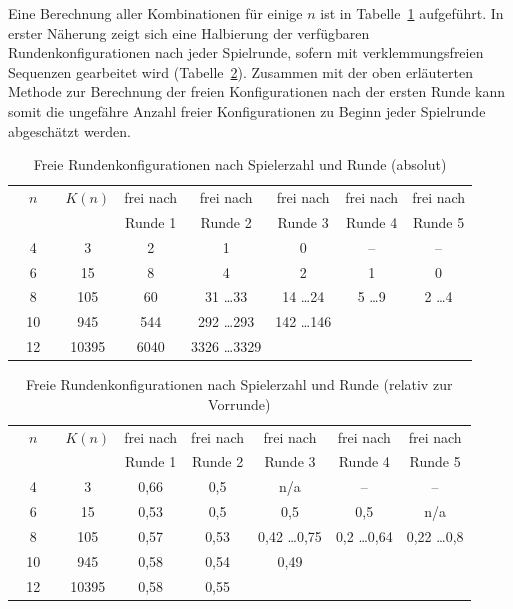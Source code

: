 \documentclass[DIV=15, 10pt]{scrartcl}
\begin{document}
Eine Berechnung aller Kombinationen für einige $n$ ist in Tabelle~\ref{tabFreeCount} aufgeführt. In erster Näherung zeigt sich eine Halbierung der verfügbaren Rundenkonfigurationen nach jeder Spielrunde, sofern mit verklemmungsfreien Sequenzen gearbeitet wird (Tabelle~\ref{tabFreeCountRel}). Zusammen mit der oben erläuterten Methode zur Berechnung der freien Konfigurationen nach der ersten Runde kann somit die ungefähre Anzahl freier Konfigurationen zu Beginn jeder Spielrunde abgeschätzt werden.

\begin{table}[htbp]
\begin{center}
\begin{tabular}{ccccccc}
\toprule
$\quad n \quad$ & $K(n)$ & frei nach & frei nach & frei nach & frei nach & frei nach\\
&& Runde 1 & Runde 2 & Runde 3 & Runde 4 & Runde 5\\[1mm]
\midrule
4 & 3 & 2 & 1 & 0 & -- & --\\[1mm]
6 & 15 & 8 & 4 & 2 & 1 & 0\\[1mm]
8 & 105 & 60 & 31 \ldots 33 & 14 \ldots 24 & 5 \ldots 9 & 2 \ldots 4\\[1mm]
10 & 945 & 544 & 292 \ldots 293 & 142 \ldots 146\\[1mm]
12 & 10395 & 6040 & 3326 \ldots 3329\\[1mm]
\bottomrule
\end{tabular}
\caption{Freie Rundenkonfigurationen nach Spielerzahl und Runde (absolut)}
\label{tabFreeCount}
\end{center}
\end{table}

\begin{table}[htbp]
\begin{center}
\begin{tabular}{ccccccc}
\toprule
$\quad n \quad$ & $K(n)$ & frei nach & frei nach & frei nach & frei nach & frei nach\\
&& Runde 1 & Runde 2 & Runde 3 & Runde 4 & Runde 5\\[1mm]
\midrule
4 & 3 & 0,66 & 0,5 & n/a & -- & --\\[1mm]
6 & 15 & 0,53 & 0,5 & 0,5 & 0,5 & n/a\\[1mm]
8 & 105 & 0,57 & 0,53 & 0,42 \ldots 0,75 & 0,2 \ldots 0,64 & 0,22 \ldots 0,8\\[1mm]
10 & 945 & 0,58 & 0,54 & 0,49\\[1mm]
12 & 10395 & 0,58 & 0,55\\[1mm]
\bottomrule
\end{tabular}
\caption{Freie Rundenkonfigurationen nach Spielerzahl und Runde (relativ zur Vorrunde)}
\label{tabFreeCountRel}
\end{center}
\end{table}
\end{document}
